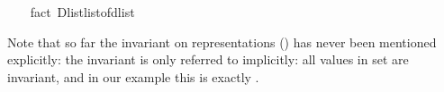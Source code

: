 \begin{isabellebody}
\ \ \isamarkupfalse%
\ {\isacharparenleft}fact\ Dlist{\isacharunderscore}list{\isacharunderscore}of{\isacharunderscore}dlist{\isacharparenright}%
\endisatagquote
{\isafoldquote}%
%
\isadelimquote
%
\endisadelimquote
%
\begin{isamarkuptext}%
\noindent Note that so far the invariant on representations
  () has never been mentioned explicitly:
  the invariant is only referred to implicitly: all values in
  set  are invariant,
  and in our example this is exactly .
  

\end{isamarkuptext}
\end{isabellebody}
